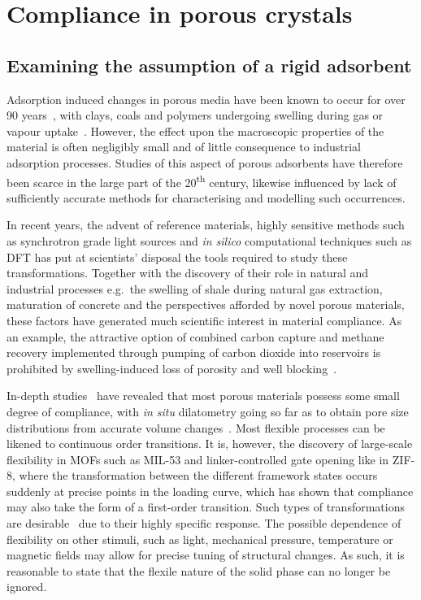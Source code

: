 
\section{Compliance in porous crystals}

\subsection{Examining the assumption of a rigid adsorbent}

Adsorption induced changes in porous media have been known
to occur for over 90 years~\cite{mcbainNatureInfluenceHumidity1927},
with clays, coals and polymers undergoing swelling during gas
or vapour uptake~\cite{gorAdsorptioninducedDeformationNanoporous2017}.
However, the effect upon the macroscopic properties of the material is 
often negligibly small and of little consequence to industrial adsorption
processes. Studies of this aspect of porous adsorbents have therefore
been scarce in the large part of the 20\textsuperscript{th} century,
likewise influenced by lack of sufficiently accurate methods for 
characterising and modelling such occurrences.

In recent years, the advent of reference materials, 
highly sensitive methods such as synchrotron grade light sources and
\textit{in silico} computational techniques such as \gls{DFT} has put at
scientists' disposal the tools required to study these transformations. 
Together with the discovery of their role in natural and industrial 
processes e.g.\ the swelling of shale during natural gas extraction,
maturation of concrete and the perspectives afforded by novel porous
materials, these factors have generated much scientific interest
in material compliance. As an example, the attractive option
of combined carbon capture and methane recovery implemented 
through pumping of carbon dioxide into reservoirs is prohibited
by swelling-induced loss of porosity and well 
blocking~\cite{gorAdsorptioninducedDeformationNanoporous2017}. 

In-depth studies~\cite{beringAlterationZeoliteGranule1977} 
have revealed that most porous materials possess some small
degree of compliance, with \textit{in situ} dilatometry going so far as to 
obtain pore size distributions from accurate volume
changes~\cite{reichenauerExtractingPoreSize2001}. Most flexible 
processes can be likened to continuous order transitions. It is, however,
the discovery of large-scale flexibility in \glspl{MOF} such as 
MIL-53 and linker-controlled gate opening like in ZIF-8, 
where the transformation between the different framework 
states occurs suddenly at precise points in the loading curve,
which has shown that compliance may also take the form of 
a first-order transition. Such types of transformations are
desirable~\cite{kitagawaFunctionalPorousCoordination2004} due to 
their highly specific response. The possible dependence 
of flexibility on other stimuli, such as light, mechanical pressure,
temperature or magnetic fields may allow for precise tuning of 
structural changes. As such, it is reasonable to state that
the flexile nature of the solid phase can no longer be ignored.

